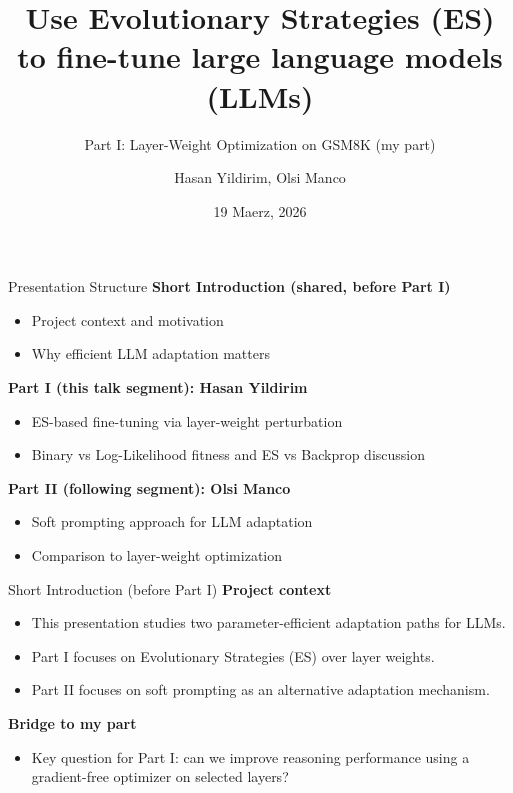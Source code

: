 \documentclass[aspectratio=169,11pt]{beamer}
\title{Use Evolutionary Strategies (ES) to fine-tune large language models (LLMs)}
\subtitle{Part I: Layer-Weight Optimization on GSM8K (my part)}
\author{Hasan Yildirim, Olsi Manco}
\institute{Uni Projekt PG ML/AI}
\date{19 Maerz, 2026}
\begin{document}
\begin{frame}
  \titlepage
\end{frame}

\begin{frame}{Presentation Structure}
\textbf{Short Introduction (shared, before Part I)}
\begin{itemize}
  \item Project context and motivation
  \item Why efficient LLM adaptation matters
\end{itemize}

\textbf{Part I (this talk segment): Hasan Yildirim}
\begin{itemize}
  \item ES-based fine-tuning via layer-weight perturbation
  \item Binary vs Log-Likelihood fitness and ES vs Backprop discussion
\end{itemize}

\textbf{Part II (following segment): Olsi Manco}
\begin{itemize}
  \item Soft prompting approach for LLM adaptation
  \item Comparison to layer-weight optimization
\end{itemize}
\end{frame}

\begin{frame}{Short Introduction (before Part I)}
\textbf{Project context}
\begin{itemize}
  \item This presentation studies two parameter-efficient adaptation paths for LLMs.
  \item Part I focuses on Evolutionary Strategies (ES) over layer weights.
  \item Part II focuses on soft prompting as an alternative adaptation mechanism.
\end{itemize}

\textbf{Bridge to my part}
\begin{itemize}
  \item Key question for Part I: can we improve reasoning performance using a gradient-free optimizer on selected layers?
\end{itemize}
\end{frame}
\end{document}
